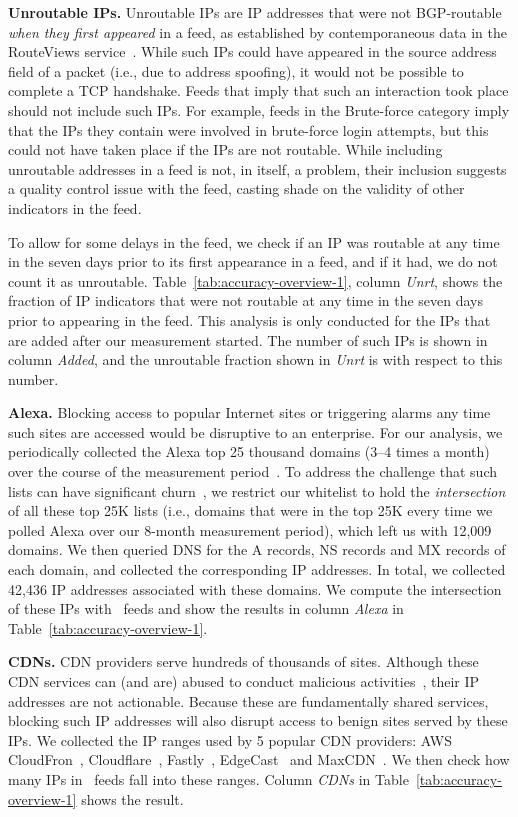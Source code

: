 \noindent\textbf{Unroutable IPs.} Unroutable IPs are IP addresses that
were not BGP-routable \emph{when they first appeared} in a feed, as
established by contemporaneous data in the RouteViews
service~\cite{Routeview}. While such IPs could have appeared in the
source address field of a packet (i.e., due to address spoofing), it
would not be possible to complete a TCP handshake. Feeds that imply
that such an interaction took place should not include such IPs. For
example, feeds in the Brute-force category imply that the IPs they
contain were involved in brute-force login attempts, but this could
not have taken place if the IPs are not routable. While including
unroutable addresses in a feed is not, in itself, a problem, their
inclusion suggests a quality control issue with the feed, casting
shade on the validity of other indicators in the feed.

To allow for some delays in the feed, we check if an IP was routable
at any time in the seven days prior to its first appearance in a feed,
and if it had, we do not count it as
unroutable. Table~\ref{tab:accuracy-overview-1}, column \textit{Unrt},
shows the fraction of IP indicators that were not routable at any time
in the seven days prior to appearing in the feed. This analysis is
only conducted for the IPs that are added after our measurement
started. The number of such IPs is shown in column \textit{Added}, and
the unroutable fraction shown in \textit{Unrt} is with respect to this
number.

\noindent\textbf{Alexa.} Blocking access to popular Internet sites or
triggering alarms any time such sites are accessed would be disruptive
to an enterprise. For our analysis, we periodically collected the
Alexa top 25 thousand domains (3--4 times a month) over the course of
the measurement period~\cite{alexa}. To address the challenge that
such lists can have significant churn~\cite{scheitle2018long}, we
restrict our whitelist to hold the \emph{intersection} of all these
top 25K lists (i.e., domains that were in the top 25K every time we
polled Alexa over our 8-month measurement period), which left us with
12,009 domains.   We then queried DNS for the A records, NS
records and MX records of each domain, and collected the corresponding
IP addresses. In total, we collected 42,436 IP addresses associated
with these domains. We compute the intersection of these IPs
with \ti\ feeds and show the results in column \textit{Alexa} in
Table~\ref{tab:accuracy-overview-1}.


\noindent\textbf{CDNs.} CDN providers serve hundreds of thousands of
sites. Although these CDN services can (and are) abused to conduct
malicious activities~\cite{cdnabuse}, their IP addresses are not
actionable.  Because these are fundamentally shared services,
blocking such IP addresses will also disrupt access to benign
sites served by these IPs.  We collected the IP ranges used by 5
popular CDN providers: AWS CloudFron~\cite{cloudfront},
Cloudflare~\cite{cloudflare}, Fastly~\cite{fastly},
EdgeCast~\cite{edgecast} and MaxCDN~\cite{maxcdn}. We then check how
many IPs in \ti\ feeds fall into these ranges. Column \textit{CDNs} in
Table~\ref{tab:accuracy-overview-1} shows the result.

